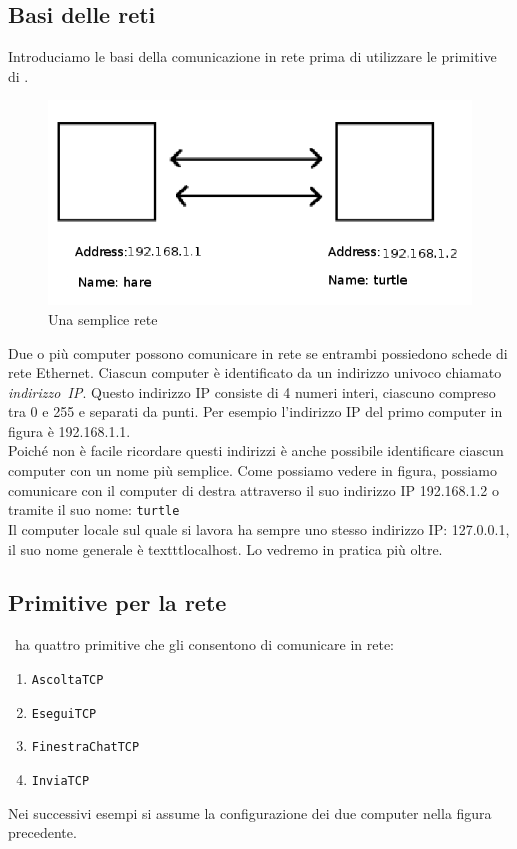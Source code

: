 \subsection{Basi delle reti}
Introduciamo le basi della comunicazione in rete prima di utilizzare le primitive di \xlogo.
\begin{figure}[h]%
	\includegraphics{pics/network.png}
	\caption{Una semplice rete}
\end{figure}

Due o più computer possono comunicare in rete se entrambi possiedono schede di rete Ethernet. Ciascun computer è identificato da un indirizzo univoco chiamato \textit{indirizzo~IP}. Questo indirizzo IP consiste di 4 numeri interi, ciascuno compreso tra 0 e 255 e separati da punti. Per esempio l'indirizzo IP del primo computer in figura è 192.168.1.1.\\
Poiché non è facile ricordare questi indirizzi è anche possibile identificare ciascun computer con un nome più semplice. Come possiamo vedere in figura, possiamo comunicare con il computer di destra attraverso il suo indirizzo IP 192.168.1.2 o tramite il suo nome: \texttt{turtle}\\
Il computer locale sul quale si lavora ha sempre uno stesso indirizzo IP: 127.0.0.1, il suo nome generale è texttt{localhost}. Lo vedremo in pratica più oltre.
 
\subsection{Primitive per la rete} 
\xlogo\ ha quattro primitive che gli consentono di comunicare in rete:
\begin{enumerate}
	\item \texttt{AscoltaTCP}
	\item \texttt{EseguiTCP}
	\item \texttt{FinestraChatTCP}
	\item \texttt{InviaTCP}
\end{enumerate} 
Nei successivi esempi si assume la configurazione dei due computer nella figura precedente.

